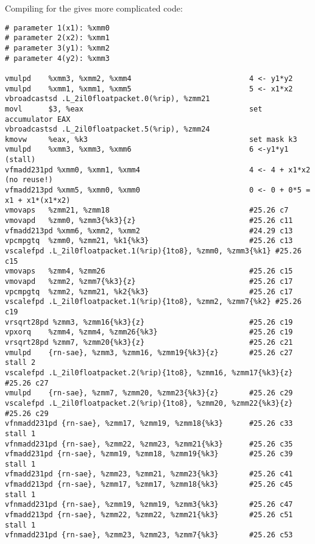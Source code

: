 Compiling for the  gives more complicated code:
\begin{verbatim}
# parameter 1(x1): %xmm0
# parameter 2(x2): %xmm1
# parameter 3(y1): %xmm2
# parameter 4(y2): %xmm3

vmulpd    %xmm3, %xmm2, %xmm4                           4 <- y1*y2
vmulpd    %xmm1, %xmm1, %xmm5                           5 <- x1*x2
vbroadcastsd .L_2il0floatpacket.0(%rip), %zmm21         
movl      $3, %eax                                      set accumulator EAX
vbroadcastsd .L_2il0floatpacket.5(%rip), %zmm24         
kmovw     %eax, %k3                                     set mask k3
vmulpd    %xmm3, %xmm3, %xmm6                           6 <-y1*y1 (stall)
vfmadd231pd %xmm0, %xmm1, %xmm4                         4 <- 4 + x1*x2 (no reuse!)
vfmadd213pd %xmm5, %xmm0, %xmm0                         0 <- 0 + 0*5 = x1 + x1*(x1*x2)
vmovaps   %zmm21, %zmm18                                #25.26 c7
vmovapd   %zmm0, %zmm3{%k3}{z}                          #25.26 c11
vfmadd213pd %xmm6, %xmm2, %xmm2                         #24.29 c13
vpcmpgtq  %zmm0, %zmm21, %k1{%k3}                       #25.26 c13
vscalefpd .L_2il0floatpacket.1(%rip){1to8}, %zmm0, %zmm3{%k1} #25.26 c15
vmovaps   %zmm4, %zmm26                                 #25.26 c15
vmovapd   %zmm2, %zmm7{%k3}{z}                          #25.26 c17
vpcmpgtq  %zmm2, %zmm21, %k2{%k3}                       #25.26 c17
vscalefpd .L_2il0floatpacket.1(%rip){1to8}, %zmm2, %zmm7{%k2} #25.26 c19
vrsqrt28pd %zmm3, %zmm16{%k3}{z}                        #25.26 c19
vpxorq    %zmm4, %zmm4, %zmm26{%k3}                     #25.26 c19
vrsqrt28pd %zmm7, %zmm20{%k3}{z}                        #25.26 c21
vmulpd    {rn-sae}, %zmm3, %zmm16, %zmm19{%k3}{z}       #25.26 c27 stall 2
vscalefpd .L_2il0floatpacket.2(%rip){1to8}, %zmm16, %zmm17{%k3}{z} #25.26 c27
vmulpd    {rn-sae}, %zmm7, %zmm20, %zmm23{%k3}{z}       #25.26 c29
vscalefpd .L_2il0floatpacket.2(%rip){1to8}, %zmm20, %zmm22{%k3}{z} #25.26 c29
vfnmadd231pd {rn-sae}, %zmm17, %zmm19, %zmm18{%k3}      #25.26 c33 stall 1
vfnmadd231pd {rn-sae}, %zmm22, %zmm23, %zmm21{%k3}      #25.26 c35
vfmadd231pd {rn-sae}, %zmm19, %zmm18, %zmm19{%k3}       #25.26 c39 stall 1
vfmadd231pd {rn-sae}, %zmm23, %zmm21, %zmm23{%k3}       #25.26 c41
vfmadd213pd {rn-sae}, %zmm17, %zmm17, %zmm18{%k3}       #25.26 c45 stall 1
vfnmadd231pd {rn-sae}, %zmm19, %zmm19, %zmm3{%k3}       #25.26 c47
vfmadd213pd {rn-sae}, %zmm22, %zmm22, %zmm21{%k3}       #25.26 c51 stall 1
vfnmadd231pd {rn-sae}, %zmm23, %zmm23, %zmm7{%k3}       #25.26 c53

\end{verbatim}

